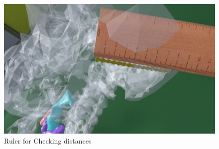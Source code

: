 \begin{figure}[ht!]
    \centering
    \includegraphics[width=\linewidth]{images/implementation/features/visualization/ruler.png}
    \caption{\label{fig::FeatureRuler} Ruler for Checking distances}
\end{figure}

